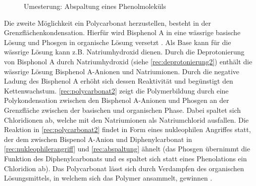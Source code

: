 \begin{figure}[h]
    \begin{center}
        \footnotesize
        \setatomsep{1.7em}


        \vspace{10pt}

        \chemrel{->}
        \chemnameinit{}
        \chemsign{+}

        \caption{Umesterung: Abspaltung eines Phenolmoleküls}
        \label{rec:abspaltung}
    \end{center}
\end{figure}

Die zweite Möglichkeit ein Polycarbonat herzustellen, besteht in der
Grenzflächenkondensation. Hierfür wird Bisphenol A in eine wässrige basische
Lösung und Phosgen in organische Lösung versetzt \cite{cuzpe}. Als Base kann für
die wässrige Lösung kann z.B. Natriumhydroxid dienen. Durch die Deprotonierung
von Bisphonol A durch Natriumhydroxid (siehe \autoref{rec:deprotonierung2})
enthält die wässrige Lösung Bisphenol A-Anionen und Natriumionen. Durch die
negative Ladung des Bisphenol A erhöht sich dessen Reaktivität und begünstigt
den Kettenwachstum. \autoref{rec:polycarbonat2} zeigt die Polymerbildung durch
eine Polykondensation zwischen den Bisphenol A-Anionen und Phosgen an der
Grenzfläche zwischen der basischen und organischen Phase. Dabei spaltet sich
Chloridionen ab, welche mit den Natriumionen als Natriumchlorid ausfallen. Die
Reaktion in \autoref{rec:polycarbonat2} findet in Form eines nukleophilen
Angriffes statt, der dem zwischen Bispenol A-Anion und Diphenylcarbonat in
\autoref{rec:nukleophilerangriff} und \autoref{rec:abspaltung} ähnelt (das
Phosgen übernimmt die Funktion des Diphenylcarbonats und es spaltet sich statt
eines Phenolations ein Chloridion ab). Das Polycarbonat lässt sich durch
Verdampfen des organischen Lösungsmittels, in welchem sich das Polymer
ansammelt, gewinnen \cite{garoo}.

